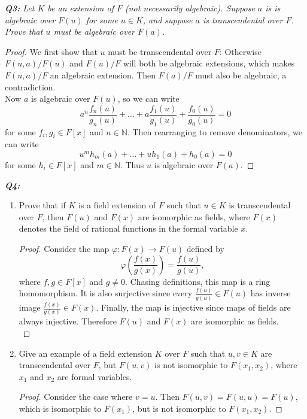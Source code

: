 \documentclass{article}
\begin{document}
\it \textbf{Q3:} Let $K$ be an extension of $F$ (not necessarily
  algebraic). Suppose $a$ is is algebraic over $F(u)$ for some $u\in K$,
  and suppose $a$ is transcendental over $F$. Prove that $u$ must be
  algebraic over $F(a)$.

  \begin{proof}
    We first show that $u$ must be transcendental over $F$: Otherwise
    $F(u,a)/F(u)$ and $F(u)/F$ will both be algebraic extensions, which
    makes $F(u,a)/F$ an algebraic extension. Then $F(a)/F$ must also be
    algebraic, a contradiction. \\

    Now $a$ is algebraic over $F(u)$, so we can write
    \[a^n\frac{f_n(u)}{g_n(u)} +\ldots +a\frac{f_1(u)}{g_1(u)}
    +\frac{f_0(u)}{g_0(u)} =0\]
    for some $f_i,g_i\in F[x]$ and $n\in\mathbb{N}$. Then rearranging to
    remove denominators, we can write
    \[u^mh_m(a) +\ldots +uh_1(a) +h_0(a)=0\]
    for some $h_i\in F[x]$ and $m\in\mathbb{N}$. Thus $u$ is algebraic over
    $F(a)$.
  \end{proof}

\it \textbf{Q4:}
  \begin{enumerate}[label={(\alph*)}]
    \item Prove that if $K$ is a field extension of $F$ such that $u\in K$
      is transcendental over $F$, then $F(u)$ and $F(x)$ are isomorphic as
      fields, where $F(x)$ denotes the field of rational functions in the
      formal variable $x$.

      \begin{proof}
        Consider the map $\varphi:F(x)\rightarrow F(u)$ defined by
        \[\varphi \left(\frac{f(x)}{g(x)} \right) =\frac{f(u)}{g(u)},\]
        where $f,g\in F[x]$ and $g\neq0$. Chasing definitions, this map is
        a ring homomorphism. It is also surjective since every
        $\frac{f(u)}{g(u)}\in F(u)$ has inverse image $\frac{f(x)}{g(x)}\in
        F(x)$. Finally, the map is injective since maps of fields are
        always injective. Therefore $F(u)$ and $F(x)$ are isomorphic as
        fields. \\
      \end{proof}

    \item Give an example of a field extension $K$ over $F$ such that
      $u,v\in K$ are transcendental over $F$, but $F(u,v)$ is not
      isomorphic to $F(x_1,x_2)$, where $x_1$ and $x_2$ are formal
      variables.

      \begin{proof}
        Consider the case where $v=u$. Then $F(u,v)=F(u,u)=F(u)$, which is
        isomorphic to $F(x_1)$, but is not isomorphic to $F(x_1,x_2)$.
      \end{proof}
  \end{enumerate}
\end{document}
